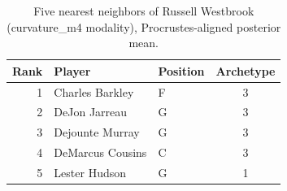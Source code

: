 \begin{table}[htbp]
  \centering\small
  \begin{tabular}{rllc}
    \toprule
    Rank & Player & Position & Archetype \\
    \midrule
    1 & Charles Barkley & F & 3 \\
    2 & DeJon Jarreau & G & 3 \\
    3 & Dejounte Murray & G & 3 \\
    4 & DeMarcus Cousins & C & 3 \\
    5 & Lester Hudson & G & 1 \\
    \bottomrule
  \end{tabular}
  \caption{Five nearest neighbors of Russell Westbrook (curvature_m4 modality), Procrustes-aligned posterior mean.}
  \label{tab:Russell_Westbrook_neighbors_curvature_m4}
\end{table}

